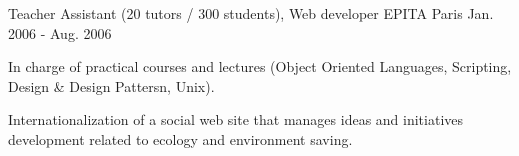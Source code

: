 \begin{cventries}
  \cventry
    {Teacher Assistant (20 tutors / 300 students), Web developer} %
    {EPITA} %
    {Paris} %
    {Jan. 2006 - Aug. 2006} %
    {
      \begin{cvitems} %
        \item {In charge of practical courses and lectures (Object Oriented Languages, Scripting, Design \& Design Pattersn, Unix).}
        \item {Internationalization of a social web site that manages ideas and initiatives development related to ecology and environment saving.}
      \end{cvitems}
    }

\end{cventries}
